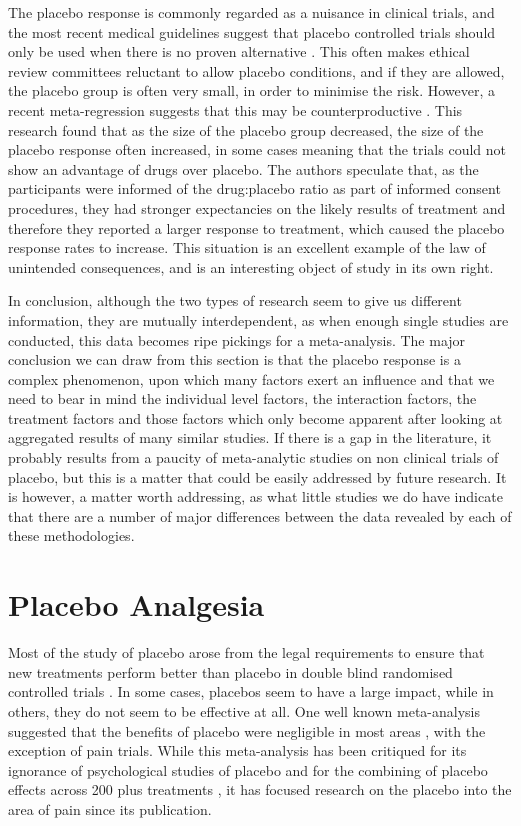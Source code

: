 The placebo response is commonly regarded as a nuisance in clinical trials, and the most recent medical guidelines suggest that placebo controlled trials should only be used when there is no proven alternative \cite{temple2000placebo}. This often makes ethical review committees reluctant to allow placebo conditions, and if they are allowed, the placebo group is often very small, in order to minimise the risk. However, a recent meta-regression suggests that this may be counterproductive \cite{Papakostas2009}.  This research found that as the size of the placebo group decreased, the size of the placebo response often increased, in some cases meaning that the trials could not show an advantage of drugs over placebo. The authors speculate that, as the participants were informed of the drug:placebo ratio as part of informed consent procedures, they had stronger expectancies on the likely results of treatment and therefore they reported a larger response to treatment, which caused the placebo response rates to increase. This situation is an excellent example of the law of unintended consequences, and is an interesting object of study in its own right. 


In conclusion, although the two types of research seem to give us different information, they are mutually interdependent, as when enough single studies are conducted, this data becomes ripe pickings for a meta-analysis. The major conclusion we can draw from this section is that the placebo response is a complex phenomenon, upon which many factors exert an influence and that we need to bear in mind the individual level factors, the interaction factors, the treatment factors and those factors which only become apparent after looking at aggregated results of many similar studies. If there is a gap in the literature, it probably results from a paucity of meta-analytic studies on non clinical trials of placebo, but this is a matter that could be easily addressed by future research. It is however, a matter worth addressing, as what little studies we do have indicate that there are a number of major differences between the data revealed by each of these methodologies. 


\section{Placebo Analgesia}
\label{sec:placebo-analgesia}

Most of the study of placebo arose from the legal requirements to ensure that new treatments perform better than placebo in double blind randomised controlled trials \cite{Kaptchuk1998}.  In some cases, placebos seem to have a large impact, while in others, they do not seem to be effective at all. One well known meta-analysis suggested that the benefits of placebo were negligible in most areas \cite{hrobjartsson2001placebo}, with the exception of pain trials. While this meta-analysis has been critiqued for its ignorance of psychological studies of placebo \cite{Evans2003,Stewart-Williams2004b}   and for the combining of placebo effects across 200 plus treatments \cite{Wickramasekera2001}, it has focused research on the placebo into the area of pain since its publication. 


